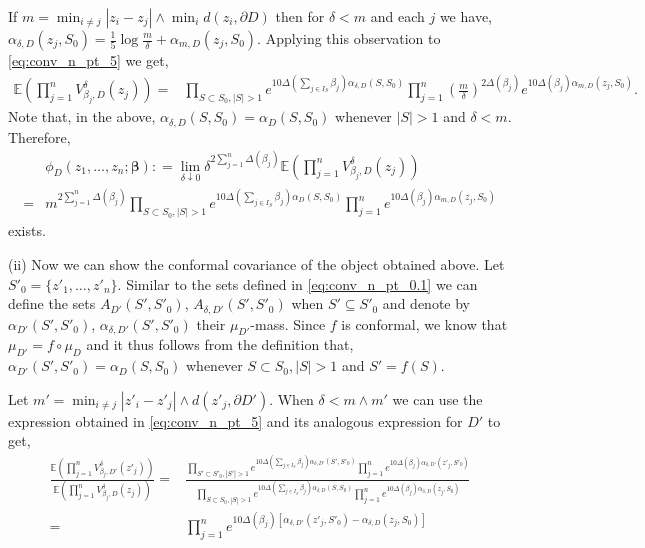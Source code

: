\documentclass[a4paper, 11pt, reqno]{amsart}
\theoremstyle{definition} \newtheorem{defn}{Definition}[section]
\theoremstyle{remark} \newtheorem{rem}[defn]{Remark}
\theoremstyle{remark} \newtheorem*{rem*}{Remark}
\theoremstyle{plain} \newtheorem{thm}[defn]{Theorem}
\theoremstyle{plain} \newtheorem{lem}[defn]{Lemma}
\theoremstyle{plain} \newtheorem{prop}[defn]{Proposition}
\theoremstyle{plain} \newtheorem{cor}[defn]{Corollary}
\theoremstyle{remark} \newtheorem{exm}[defn]{\textbf{Example}}
\theoremstyle{remark} \newtheorem{exms}[defn]{\textbf{Examples}}
\theoremstyle{remark} \newtheorem*{bl}{}
\numberwithin{equation}{section} %
\newcommand{\E}{\mathbb{E}}
\begin{document}
		If $m = \min_{i\neq j}|z_i-z_j|\wedge \min_i d(z_i, \partial D)$ then for $\delta < m$ and each $j$ we have, $\alpha_{\delta, D}(z_j, S_0) = \frac{1}{5} \log \frac{m}{\delta} + \alpha_{m, D} (z_j, S_0)$. Applying this observation to \eqref{eq:conv_n_pt_5} we get,
		\begin{align}\label{eq:conv_n_pt_6}
			\E\left(\prod_{j=1}^n V^{\delta}_{\beta_j , D}(z_j)\right) = & \prod_{S\subset S_0, |S|>1}  e^{10 \Delta\left(\sum_{j \in I_S} \beta_j\right) \alpha_{\delta, D}(S, S_0)}
			\prod_{j=1}^n \left(\frac{m}{\delta}\right)^{2\Delta(\beta_j)} e^{10\Delta(\beta_j)\alpha_{m, D}(z_j, S_0)}.
		\end{align}
		Note that, in the above, $\alpha_{\delta , D} (S, S_0) = \alpha_{D}(S, S_0)$ whenever $|S|>1$ and $\delta <m$. Therefore,
		\begin{align}\label{eq:conv_n_pt_7}
			 & \phi_D(z_1, \ldots, z_n ; \bm{\beta}) : =  \lim_{\delta \downarrow 0} \delta^{2\sum_{j=1}^n \Delta(\beta_j) }\E\left(\prod_{j=1}^n V^{\delta}_{\beta_j , D}(z_j)\right)	
			\nonumber \\
            = & m^{2\sum_{j=1}^n \Delta(\beta_j) } \prod_{S\subset S_0, |S|>1}  e^{10 \Delta\left(\sum_{j \in I_S} \beta_j\right) \alpha_{D}(S, S_0)}         
            \prod_{j=1}^n e^{10\Delta(\beta_j)\alpha_{m, D}(z_j, S_0)}			
		\end{align}
		exists.
        
       (ii) Now we can show the conformal covariance of the object obtained above. Let $S'_0 = \{ z'_1, \ldots, z'_n\}$. Similar to the sets defined in \eqref{eq:conv_n_pt_0.1} we can define the sets $A_{D'}(S', S'_0)$, $A_{\delta, D'} (S', S'_0)$ when $S'\subseteq S'_0$ and denote by $\alpha_{D'}(S', S'_0)$, $\alpha_{\delta, D'}(S', S'_0)$ their $\mu_{D'}$-mass. Since $f$ is conformal, we know that $\mu_{D'} = f \circ \mu_D$ and it thus follows from the definition that, $\alpha_{D'}(S', S'_0) = \alpha_{D}(S, S_0)$ whenever $S\subset S_0, |S|>1$ and $S'= f(S)$. 

       Let $m' = \min_{i\neq j}|z'_i - z'_j| \wedge d(z'_j, \partial D')$. When $\delta< m \wedge m'$ we can use the expression obtained in \eqref{eq:conv_n_pt_5} and its analogous expression for $D'$ to get, 
       \begin{align} \label{eq:conv_n_pt_8}
           \frac{\E\left(\prod_{j=1}^n V^{\delta}_{\beta_j , D'}(z'_j)\right) }{\E\left(\prod_{j=1}^n V^{\delta}_{\beta_j , D}(z_j)\right) } =  & \frac{ \prod_{S'\subset S'_0, |S'|>1}  e^{10 \Delta\left(\sum_{j \in I_S} \beta_j\right) \alpha_{\delta, D'}(S', S'_0)}
			\prod_{j=1}^n e^{10\Delta(\beta_j)\alpha_{\delta, D'}(z'_j, S'_0)} }
            {\prod_{S\subset S_0, |S|>1}  e^{10 \Delta\left(\sum_{j \in I_S} \beta_j\right) \alpha_{\delta, D}(S, S_0)}
			\prod_{j=1}^n e^{10\Delta(\beta_j)\alpha_{\delta, D}(z_j, S_0)}}
            \nonumber \\
            = & \prod_{j=1}^n e^{10\Delta(\beta_j)[\alpha_{\delta, D'}(z'_j, S'_0)-\alpha_{\delta, D}(z_j, S_0)]}
       \end{align}
\end{document}
